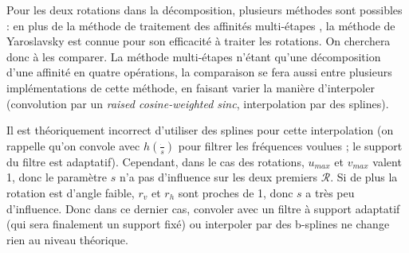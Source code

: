 
Pour les deux rotations dans la décomposition, plusieurs méthodes sont possibles : en plus de la méthode de traitement des affinités multi-étapes \cite{szeliski2010high}, la méthode de Yaroslavsky \cite{unser1995convolution} est connue pour son efficacité à traiter les rotations. On cherchera donc à les comparer. La méthode multi-étapes n'étant qu'une décomposition d'une affinité en quatre opérations, la comparaison se fera aussi entre plusieurs implémentations de cette méthode, en faisant varier la manière d'interpoler (convolution par un \emph{raised cosine-weighted sinc}, interpolation par des splines).

Il est théoriquement incorrect d'utiliser des splines pour cette interpolation (on rappelle qu'on convole avec $h(\frac{\dot{}}{s})$ pour filtrer les fréquences voulues ; le support du filtre est adaptatif). Cependant, dans le cas des rotations, $u_{max}$ et $v_{max}$ valent 1, donc le paramètre $s$ n'a pas d'influence sur les deux premiers $\mathcal R$. Si de plus la rotation est d'angle faible, $r_v$ et $r_h$ sont proches de 1, donc $s$ a très peu d'influence. Donc dans ce dernier cas, convoler avec un filtre à support adaptatif (qui sera finalement un support fixé) ou interpoler par des b-splines ne change rien au niveau théorique.
